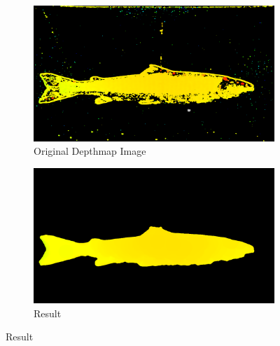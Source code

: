 \begin{figure}[H]
    \medskip
    \begin{subfigure}{0.49\textwidth}
        \includegraphics[width=\linewidth]{images/results/algorithm_test/original_82}
        \caption{Original Depthmap Image} 
        \label{fig:original_depthmap_82}
    \end{subfigure}\hspace*{\fill}
    \begin{subfigure}{0.49\textwidth}
        \includegraphics[width=\linewidth]{images/results/algorithm_test/median_filter_63}
        \caption{Result} 
        \label{fig:result_82}
    \end{subfigure}
    

\end{figure}

